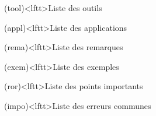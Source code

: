 \documentclass[../../main/main.tex]{subfiles}
\begin{document}
\begin{boxes}
\begin{tcb}
	\end{tcb}
	\begin{tcb}(tool)<lftt>{Liste des outils}
	\end{tcb}
	\begin{tcb}(appl)<lftt>{Liste des applications}
	\end{tcb}
	\begin{tcb}(rema)<lftt>{Liste des remarques}
	\end{tcb}
	\begin{tcb}(exem)<lftt>{Liste des exemples}
	\end{tcb}
	\begin{tcb}(ror)<lftt>{Liste des points importants}
	\end{tcb}
	\begin{tcb}(impo)<lftt>{Liste des erreurs communes}
	\end{tcb}
\end{boxes}
\newpage
\end{document}
